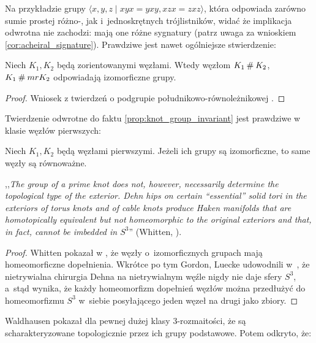 Na przykładzie grupy $\langle x,y,z \mid xyx=yxy,xzx=zxz\rangle$, która odpowiada zarówno sumie prostej różno-, jak i~jednoskrętnych trójlistników, widać że implikacja odwrotna nie zachodzi: mają one różne sygnatury (patrz uwaga za wnioskiem \ref{cor:acheiral_signature}).
Prawdziwe jest nawet ogólniejsze stwierdzenie:

\begin{proposition}
    Niech $K_1, K_2$ będą zorientowanymi węzłami.
    Wtedy węzłom $K_1 \mathbin{\#} K_2$, $K_1 \mathbin{\#} mr K_2$ odpowiadają izomorficzne grupy.
\end{proposition}

\begin{proof}
    Wniosek z twierdzeń o podgrupie południkowo-równoleżnikowej \cite[s. 75]{kawauchi96}.
\end{proof}

Twierdzenie odwrotne do faktu \ref{prop:knot_group_invariant} jest prawdziwe w klasie węzłów pierwszych:

\begin{proposition}
    Niech $K_1, K_2$ będą węzłami pierwszymi.
    Jeżeli ich grupy są izomorficzne, to same węzły są równoważne.
\end{proposition}

,,\emph{The group of a prime knot does not, however, necessarily determine the topological type of the exterior. Dehn hips on certain “essential” solid tori in the exteriors of torus knots and of cable knots produce Haken manifolds that are homotopically equivalent but not homeomorphic to the original exteriors and that, in fact, cannot be imbedded in $S^3$}'' (Whitten, \cite{whitten87}).
%

\begin{proof}
%
%
%
    Whitten pokazał w \cite{whitten87}, że węzły o~izomorficznych grupach mają homeomorficzne dopełnienia.
    Wkrótce po tym Gordon, Luecke udowodnili w~\cite{gordon89}, że nietrywialna chirurgia Dehna na nietrywialnym węźle nigdy nie daje sfery $S^3$, a~stąd wynika, że każdy homeomorfizm dopełnień węzłów można przedłużyć do homeomorfizmu $S^3$ w~siebie posyłającego jeden węzeł na drugi jako zbiory.
%
\end{proof}

Waldhausen \cite{waldhausen68} pokazał dla pewnej dużej klasy 3-rozmaitości, że są scharakteryzowane topologicznie przez ich grupy podstawowe.
%
Potem odkryto, że:

